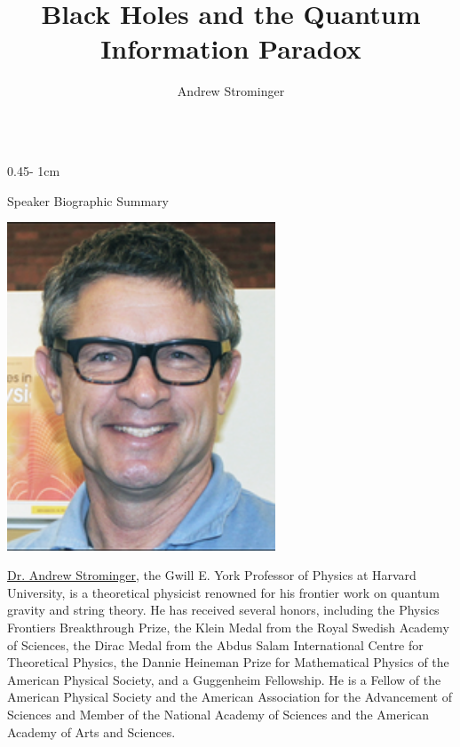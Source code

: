 \documentclass{../psuposter}
\title{Black Holes and the Quantum Information Paradox}
\author{Andrew Strominger}
\institute{Center for the Fundamental Laws of Nature, Harvard University}
\begin{document}
\begin{frame}
\begin{columns}[t, totalwidth=\textwidth]
\begin{column}{0.45\textwidth - 1cm}


    \begin{block}{Speaker Biographic Summary}
    	\begin{center}
    		\includegraphics[width=0.6\textwidth]{images/strominger}
    	\end{center}
    	\href{https://www.physics.harvard.edu/people/facpages/strominger}{Dr. Andrew Strominger}, the Gwill E. York Professor of Physics at Harvard University, is a theoretical physicist renowned for his frontier work on quantum gravity and string theory.  He has received several honors, including the Physics Frontiers Breakthrough Prize, the Klein Medal from the Royal Swedish Academy of Sciences, the Dirac Medal from the Abdus Salam International Centre for Theoretical Physics, the Dannie Heineman Prize for Mathematical Physics of the American Physical Society, and a Guggenheim Fellowship. He is a Fellow of the American Physical Society and the American Association for the Advancement of Sciences and Member of the National Academy of Sciences and the American Academy of Arts and Sciences.
    \end{block}



\end{column}
\end{columns}
\end{frame}
\end{document}

